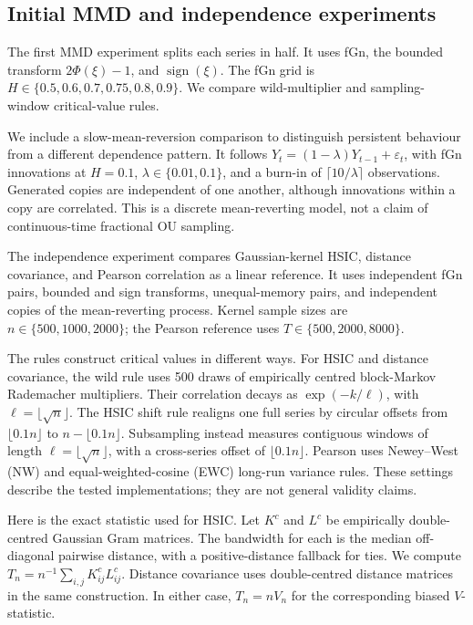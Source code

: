 \documentclass[11pt]{article}
\theoremstyle{remark}
\begin{document}
\subsection{Initial MMD and independence experiments}
The first MMD experiment splits each series in half. It uses fGn, the bounded transform $2\Phi(\xi)-1$, and $\operatorname{sign}(\xi)$. The fGn grid is $H\in\{0.5,0.6,0.7,0.75,0.8,0.9\}$. We compare wild-multiplier and sampling-window critical-value rules.

We include a slow-mean-reversion comparison to distinguish persistent behaviour from a different dependence pattern. It follows $Y_t=(1-\lambda)Y_{t-1}+\varepsilon_t$, with fGn innovations at $H=0.1$, $\lambda\in\{0.01,0.1\}$, and a burn-in of $\lceil10/\lambda\rceil$ observations. Generated copies are independent of one another, although innovations within a copy are correlated. This is a discrete mean-reverting model, not a claim of continuous-time fractional OU sampling.

The independence experiment compares Gaussian-kernel HSIC, distance covariance, and Pearson correlation as a linear reference. It uses independent fGn pairs, bounded and sign transforms, unequal-memory pairs, and independent copies of the mean-reverting process. Kernel sample sizes are $n\in\{500,1000,2000\}$; the Pearson reference uses $T\in\{500,2000,8000\}$.

The rules construct critical values in different ways. For HSIC and distance covariance, the wild rule uses 500 draws of empirically centred block-Markov Rademacher multipliers. Their correlation decays as $\exp(-k/\ell)$, with $\ell=\lfloor\sqrt n\rfloor$. The HSIC shift rule realigns one full series by circular offsets from $\lfloor0.1n\rfloor$ to $n-\lfloor0.1n\rfloor$. Subsampling instead measures contiguous windows of length $\ell=\lfloor\sqrt n\rfloor$, with a cross-series offset of $\lfloor0.1n\rfloor$. Pearson uses Newey--West (NW) and equal-weighted-cosine (EWC) long-run variance rules. These settings describe the tested implementations; they are not general validity claims.

Here is the exact statistic used for HSIC. Let $K^c$ and $L^c$ be empirically double-centred Gaussian Gram matrices. The bandwidth for each is the median off-diagonal pairwise distance, with a positive-distance fallback for ties. We compute $T_n=n^{-1}\sum_{i,j}K^c_{ij}L^c_{ij}$. Distance covariance uses double-centred distance matrices in the same construction. In either case, $T_n=nV_n$ for the corresponding biased $V$-statistic.
\end{document}
